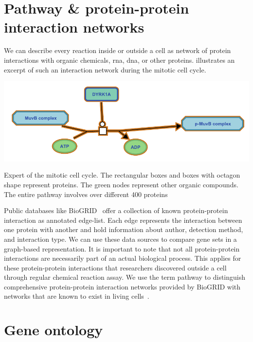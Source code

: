\documentclass{thesisclass}
\begin{document}
\section{Pathway \& protein-protein interaction networks}

We can describe every reaction inside or outside a cell as network of protein interactions with organic chemicals, \acrshort{rna}, \acrshort{dna}, or other proteins.  illustrates an excerpt of such an interaction network during the mitotic cell cycle.

\begin{centeredFigure}[!ht]
	\includegraphics[scale=0.8]{figures/introduction/pathway.pdf}
	\caption[Expert of the mitotic cell cycle.]{Expert of the mitotic cell cycle.  The rectangular boxes and boxes with octagon shape represent proteins. The green nodes represent other organic compounds. The entire pathway involves over different 400 proteins}
	\label{fig:pathway}
\end{centeredFigure}

Public databases like BioGRID~\cite{doi:10.1093/nar/gkw1102} offer a collection of known protein-protein interaction as annotated edge-list. Each edge represents the interaction between one protein with another and hold information about author, detection method, and interaction type. We can use these data sources to compare gene sets in a graph-based representation. It is important to note that not all protein-protein interactions are necessarily part of an actual biological process. This applies for these  protein-protein interactions that researchers discovered outside a cell through regular chemical reaction assay. We use the term pathway to distinguish comprehensive protein-protein interaction networks provided by BioGRID with networks that are known to exist in living cells~\cite{doi:10.1093/nar/gkw1102}.

\section{Gene ontology}
\end{document}
